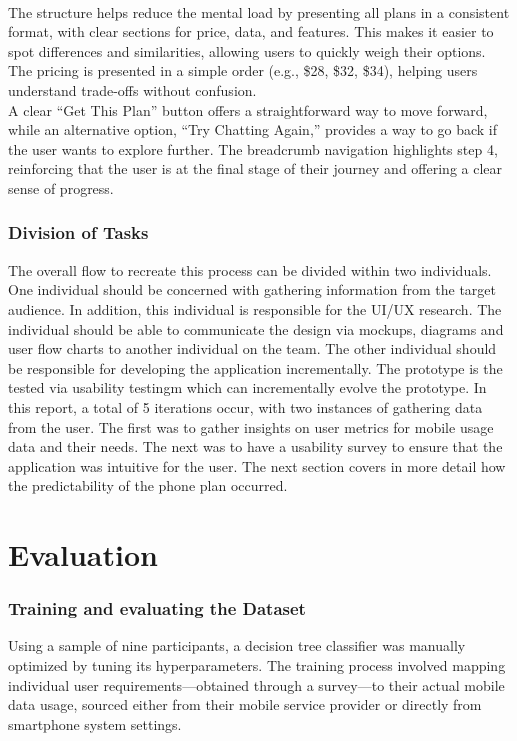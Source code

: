 \documentclass[conference]{IEEEtran}
\begin{document}
\begin{itemize}
\\
The structure helps reduce the mental load by presenting all plans in a consistent format, with clear sections for price, data, and features. This makes it easier to spot differences and similarities, allowing users to quickly weigh their options. The pricing is presented in a simple order (e.g., \$28, \$32, \$34), helping users understand trade-offs without confusion.
\\
A clear “Get This Plan” button offers a straightforward way to move forward, while an alternative option, “Try Chatting Again,” provides a way to go back if the user wants to explore further. The breadcrumb navigation highlights step 4, reinforcing that the user is at the final stage of their journey and offering a clear sense of progress.
\end{itemize}
\subsubsection{Division of Tasks}
The overall flow to recreate this process can be divided within two individuals. One individual should be concerned with gathering information from the target audience. In addition, this individual is responsible for the UI/UX research. The individual should be able to communicate the design via mockups, diagrams and user flow charts to another individual on the team. The other individual should be responsible for developing the application incrementally. The prototype is the tested via usability testingm which can incrementally evolve the prototype. In this report, a total of 5 iterations occur, with two instances of gathering data from the user. The first was to gather insights on user metrics for mobile usage data and their needs. The next was to have a usability survey to ensure that the application was intuitive for the user. The next section covers in more detail how the predictability of the phone plan occurred.

\section{Evaluation}
\subsubsection{Training and evaluating the Dataset}

Using a sample of nine participants, a decision tree classifier was manually optimized by tuning its hyperparameters. The training process involved mapping individual user requirements—obtained through a survey—to their actual mobile data usage, sourced either from their mobile service provider or directly from smartphone system settings.
\end{document}

